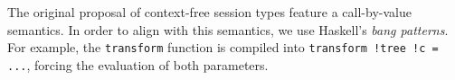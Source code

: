 The original proposal of context-free session types feature a
call-by-value semantics. In order to align \freest{} with this
semantics, we use Haskell's \emph{bang patterns}. For example, the
\lstinline|transform| function is compiled into
\lstinline|transform !tree !c = ...|, forcing the evaluation of both
parameters.

